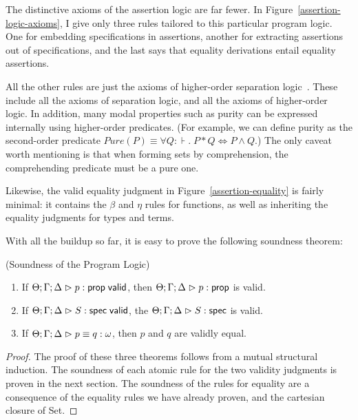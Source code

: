 The distinctive axioms of the assertion logic are far fewer. In
Figure~\ref{assertion-logic-axioms}, I give only three rules tailored
to this particular program logic. One for embedding specifications in
assertions, another for extracting assertions out of specifications,
and the last says that equality derivations entail equality
assertions. 

All the other rules are just the axioms of higher-order separation
logic~\cite{hosl}. These include all the axioms of separation logic,
and all the axioms of higher-order logic. In addition, many modal
properties such as purity can be expressed internally using
higher-order predicates. (For example, we can define purity as the
second-order predicate $\mathit{Pure}(P) \equiv \forall Q:\assert.\;P
* Q \iff P \land Q$.) The only caveat worth mentioning is that when
forming sets by comprehension, the comprehending predicate must be a
pure one.

Likewise, the valid equality judgment in
Figure~\ref{assertion-equality} is fairly minimal: it contains the
$\beta$ and $\eta$ rules for functions, as well as inheriting the
equality judgments for types and terms.

With all the buildup so far, it is easy to prove the following soundness
theorem:

\begin{theorem}{(Soundness of the Program Logic)}
  \begin{enumerate}
  \item If ${\Theta; \Gamma; \Delta} \vartriangleright {p} : \mathsf{prop} \;\mathsf{valid}$, then ${\Theta; \Gamma; \Delta} \vartriangleright {p} : {\mathsf{prop}}$ is valid.

  \item If ${\Theta; \Gamma; \Delta} \vartriangleright {S} : \mathsf{spec} \;\mathsf{valid}$, the ${\Theta; \Gamma; \Delta} \vartriangleright {S} : \mathsf{spec}$ is valid.

  \item If ${\Theta; \Gamma; \Delta} \vartriangleright {p} \equiv {q} : {\omega}$, then $p$ and $q$ are validly equal.
  \end{enumerate}
\end{theorem}

\begin{proof}
  The proof of these three theorems follows from a mutual structural
  induction.  The soundness of each atomic rule for the two validity
  judgments is proven in the next section. The soundness of the rules
  for equality are a consequence of the equality rules we have already
  proven, and the cartesian closure of Set.  
\end{proof}






